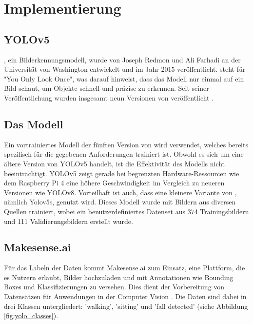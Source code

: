\clearpage

\section{Implementierung}

\subsection{YOLOv5}
, ein Bilderkennungsmodell, wurde von Joseph Redmon und Ali Farhadi an der Universität von Washington entwickelt und im Jahr 2015 veröffentlicht.  steht für "You Only Look Once", was darauf hinweist, dass das Modell nur einmal auf ein Bild schaut, um Objekte schnell und präzise zu erkennen. Seit seiner Veröffentlichung wurden insgesamt neun Versionen von  veröffentlicht \cite{Yolo} .

\subsection{Das Modell}
Ein vortrainiertes Modell der fünften Version von  wird verwendet, welches bereits spezifisch für die gegebenen Anforderungen trainiert ist. Obwohl es sich um eine ältere Version von YOLOv5 handelt, ist die Effektivität des Modells nicht beeinträchtigt. YOLOv5 zeigt gerade bei begrenzten Hardware-Ressourcen wie dem Raspberry Pi 4 eine höhere Geschwindigkeit im Vergleich zu neueren Versionen wie YOLOv8. Vorteilhaft ist auch, dass eine kleinere Variante von , nämlich Yolov5s, genutzt wird. Dieses Modell wurde mit Bildern aus diversen Quellen trainiert, wobei ein benutzerdefiniertes Datenset aus 374 Trainingsbildern und 111 Validierungsbildern erstellt wurde.

\subsection{Makesense.ai}
Für das Labeln der Daten kommt Makesense.ai zum Einsatz, eine Plattform, die es Nutzern erlaubt, Bilder hochzuladen und mit Annotationen wie Bounding Boxes und Klassifizierungen zu versehen. Dies dient der Vorbereitung von Datensätzen für Anwendungen in der Computer Vision \cite{noauthor_make_nodate}. Die Daten sind dabei in drei Klassen untergliedert: 'walking', 'sitting' und 'fall detected' (siehe Abbildung \ref{fig:yolo_classes}).


